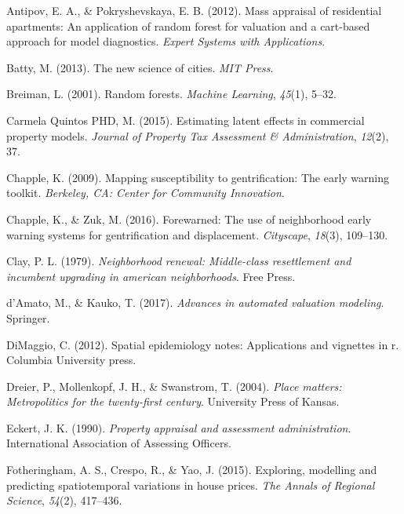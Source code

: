 \documentclass[conference,final,]{IEEEtran}
\begin{document}
\leavevmode\hypertarget{ref-antipov12}{}%
Antipov, E. A., \& Pokryshevskaya, E. B. (2012). Mass appraisal of
residential apartments: An application of random forest for valuation
and a cart-based approach for model diagnostics. \emph{Expert Systems
with Applications}.

\leavevmode\hypertarget{ref-Batty2013}{}%
Batty, M. (2013). The new science of cities. \emph{MIT Press}.

\leavevmode\hypertarget{ref-breiman2001random}{}%
Breiman, L. (2001). Random forests. \emph{Machine Learning},
\emph{45}(1), 5--32.

\leavevmode\hypertarget{ref-Quintos2013}{}%
Carmela Quintos PHD, M. (2015). Estimating latent effects in commercial
property models. \emph{Journal of Property Tax Assessment \&
Administration}, \emph{12}(2), 37.

\leavevmode\hypertarget{ref-Chapple2009}{}%
Chapple, K. (2009). Mapping susceptibility to gentrification: The early
warning toolkit. \emph{Berkeley, CA: Center for Community Innovation}.

\leavevmode\hypertarget{ref-Chapple2016}{}%
Chapple, K., \& Zuk, M. (2016). Forewarned: The use of neighborhood
early warning systems for gentrification and displacement.
\emph{Cityscape}, \emph{18}(3), 109--130.

\leavevmode\hypertarget{ref-Clay1979}{}%
Clay, P. L. (1979). \emph{Neighborhood renewal: Middle-class
resettlement and incumbent upgrading in american neighborhoods}. Free
Press.

\leavevmode\hypertarget{ref-Springer2017}{}%
d'Amato, M., \& Kauko, T. (2017). \emph{Advances in automated valuation
modeling}. Springer.

\leavevmode\hypertarget{ref-dimaggio2012spatial}{}%
DiMaggio, C. (2012). Spatial epidemiology notes: Applications and
vignettes in r. Columbia University press.

\leavevmode\hypertarget{ref-Dreier2004}{}%
Dreier, P., Mollenkopf, J. H., \& Swanstrom, T. (2004). \emph{Place
matters: Metropolitics for the twenty-first century}. University Press
of Kansas.

\leavevmode\hypertarget{ref-Eckert1990}{}%
Eckert, J. K. (1990). \emph{Property appraisal and assessment
administration}. International Association of Assessing Officers.

\leavevmode\hypertarget{ref-Fotheringham2015}{}%
Fotheringham, A. S., Crespo, R., \& Yao, J. (2015). Exploring, modelling
and predicting spatiotemporal variations in house prices. \emph{The
Annals of Regional Science}, \emph{54}(2), 417--436.
\end{document}
